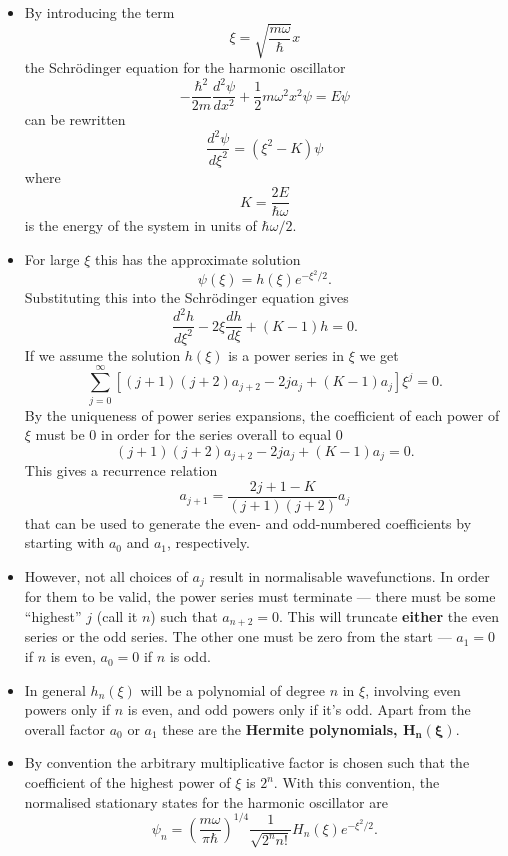 \documentclass{article}
\begin{document}
\begin{itemize}
  \item By introducing the term \[\xi = \sqrt{\frac{m \omega}{\hbar}} x\] the Schrödinger equation for the harmonic oscillator \[-\frac{\hbar^2}{2 m} \frac{d^2 \psi}{d x^2} + \frac{1}{2} m \omega^2 x^2 \psi = E \psi\] can be rewritten \[\frac{d^2 \psi}{d \xi^2} = (\xi^2 - K) \psi\] where \[K = \frac{2 E}{\hbar \omega}\] is the energy of the system in units of $\hbar \omega / 2$.

  \item For large $\xi$ this has the approximate solution \[\psi(\xi) = h(\xi) e^{-\xi^2 / 2}.\] Substituting this into the Schrödinger equation gives \[\frac{d^2 h}{d \xi^2} - 2 \xi \frac{d h}{d \xi} + (K - 1) h = 0.\] If we assume the solution $h(\xi)$ is a power series in $\xi$ we get \[\sum_{j = 0}^\infty [(j + 1) (j + 2) a_{j + 2} - 2 j a_j + (K - 1) a_j] \xi^j = 0.\] By the uniqueness of power series expansions, the coefficient of each power of $\xi$ must be $0$ in order for the series overall to equal $0$ \[(j + 1) (j + 2) a_{j + 2} - 2 j a_j + (K - 1) a_j = 0.\] This gives a recurrence relation \[a_{j + 1} = \frac{2 j + 1 - K}{(j + 1) (j + 2)} a_j\] that can be used to generate the even- and odd-numbered coefficients by starting with $a_0$ and $a_1$, respectively.

  \item However, not all choices of $a_j$ result in normalisable wavefunctions. In order for them to be valid, the power series must terminate — there must be some ``highest'' $j$ (call it $n$) such that $a_{n + 2} = 0$. This will truncate \textbf{either} the even series or the odd series. The other one must be zero from the start — $a_1 = 0$ if $n$ is even, $a_0 = 0$ if $n$ is odd.

  \item In general $h_n(\xi)$ will be a polynomial of degree $n$ in $\xi$, involving even powers only if $n$ is even, and odd powers only if it's odd. Apart from the overall factor $a_0$ or $a_1$ these are the \textbf{Hermite polynomials, $\boldsymbol{H_n(\xi)}$}.

  \item By convention the arbitrary multiplicative factor is chosen such that the coefficient of the highest power of $\xi$ is $2^n$. With this convention, the normalised stationary states for the harmonic oscillator are \[\psi_n = \left( \frac{m \omega}{\pi \hbar} \right)^{1 / 4} \frac{1}{\sqrt{2^n n!}} H_n(\xi) e^{-\xi^2 / 2}.\]
\end{itemize}
\end{document}
